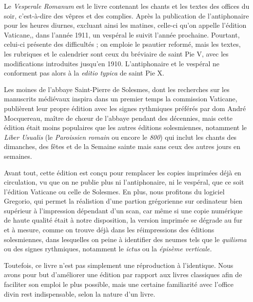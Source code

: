 
\begin{frpars}
Le \textit{Vesperale Romanum} est le livre contenant les chants et les textes des offices du soir, c’est-à-dire des vêpres et des complies. Après la publication de l'antiphonaire pour les heures diurnes, excluant ainsi les matines, celle-ci qu'on appelle l'édition Vaticane,, dans l'année 1911, un vespéral le suivit l'année prochaine. Pourtant, celui-ci présente des difficultés ; on emploie le psautier reformé, mais les textes, les rubriques et le calendrier sont ceux du bréviaire de saint Pie V, avec les modifications introduites jusqu'en 1910. L'antiphonaire et le vespéral ne conforment pas alors à la \textit{editio typica} de saint Pie \textsc{X}.

Les moines de l'abbaye Saint-Pierre de Solesmes, dont les recherches sur les manuscrits médiévaux inspira dans un premier temps la commission Vaticane, publièrent leur propre édition avec les signes rythmiques préférés par dom André Mocquereau, maître de chœur de l'abbaye pendant des décennies, mais cette édition était moins populaires que les autres éditions solesmiennes, notamment le \textit{Liber Usualis} (le \textit{Paroissien romain} ou encore le \textit{800}) qui inclut les chants des dimanches, des fêtes et de la Semaine sainte mais sans ceux des autres jours en semaines.


Avant tout, cette édition est conçu pour remplacer les copies imprimées déjà en circulation, vu que on ne publie plus ni l'antiphonaire, ni le vespéral, que ce soit l'édition Vaticane ou celle de Solesmes. En plus, nous profitons du logiciel Gregorio, qui permet la réalistion d'une partion grégorienne sur ordinateur bien supérieur à l'impression dépendant d'un scan, car même si une copie numérique de haute qualité était à notre disposition, la version imprimée se dégrade au fur et à mesure, comme on trouve déjà dans les réimpressions des éditions solesmiennes, dans lesquelles on peine à identifier des neumes tels que le \textit{quilisma} ou des signes rythmiques, notamment le \textit{ictus} ou la \textit{épisème verticale.}

Toutefois, ce livre n'est pas simplement une réproduction à l'identique. Nous avons pour but d'améliorer une édition par rapport aux livres classiques afin de faciliter son emploi le plus possible, mais une certaine familiarité avec l'office divin rest indispensable, selon la nature d'un livre.


\end{frpars}
